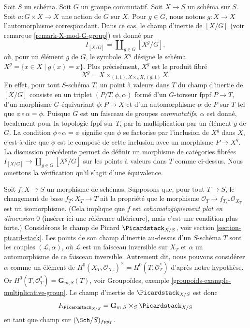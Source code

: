 \begin{example}
\label{example-inertia-stack-of-X-mod-G}
Soit $S$ un schéma. Soit $G$ un groupe commutatif.
Soit $X \to S$ un schéma sur $S$.
Soit $a : G \times X \to X$ une action de $G$ sur $X$.
Pour $g \in G$, nous notons $g : X \to X$ l'automorphisme correspondant.
Dans ce cas, le champ d'inertie de $[X/G]$ (voir
remarque \ref{remark-X-mod-G-group})
est donné par
$$
I_{[X/G]} = \coprod\nolimits_{g\in G} [X^g/G],
$$
où, pour un élément $g$ de $G$, le symbole $X^g$ désigne le
schéma $X^g = \{x \in X \mid g(x) = x\}$. Plus précisément,
$X^g$ est le produit
fibré
$$
X^g =  X \times_{(1, 1), X \times_S X, (g, 1)} X.
$$
En effet, pour tout $S$-schéma $T$, un
point à valeurs dans $T$ du champ d'inertie de $[X/G]$ consiste en un
triplet $(P/T, \phi, \alpha)$ formé d'un $G$-torseur fppf
$P \to T$, d'un morphisme $G$-équivariant
$\phi : P \to X$ et
d'un automorphisme $\alpha$ de $P$ sur $T$ tel que
$\phi \circ \alpha = \phi$.
Puisque $G$ est un faisceau de groupes \emph{commutatifs},
$\alpha$ est donné, localement pour la topologie fppf sur $T$,
par la multiplication par un élément $g$ de $G$.
La condition $\phi \circ \alpha = \phi$ signifie que $\phi$
se factorise par l'inclusion de $X^g$
dans $X$, c'est-à-dire que $\phi$ est le composé de cette inclusion avec un
morphisme $P \to X^g$.
La discussion précédente permet de définir un morphisme de catégories fibrées
$I_{[X/G]} \to \coprod_{g\in G} [X^g/G]$ sur les points à valeurs dans $T$ comme ci-dessus.
Nous omettons la vérification qu'il s'agit d'une équivalence.
\end{example}

\begin{example}
\label{example-inertia-stack-of-picard}
Soit $f : X \to S$ un morphisme de schémas.
Supposons que, pour tout $T \to S$, le changement de base $f_T : X_T \to T$
ait la propriété que le morphisme $\mathcal{O}_T \to f_{T, *}\mathcal{O}_{X_T}$
est un isomorphisme. (Cela implique que $f$ est
{\it cohomologiquement plat en dimension $0$} (insérer ici une référence ultérieure),
mais c'est une condition plus forte.) Considérons le champ de Picard $\Picardstack_{X/S}$, voir
section \ref{section-picard-stack}.
Les points de son champ d'inertie au-dessus d'un
$S$-schéma $T$ sont les couples $(\mathcal{L}, \alpha)$,
où $\mathcal{L}$ est un faisceau inversible
sur $X_T$ et $\alpha$ un automorphisme de ce faisceau inversible.
Autrement dit, nous pouvons considérer $\alpha$ comme un élément de
$H^0(X_T, \mathcal{O}_{X_T})^\times = H^0(T, \mathcal{O}_T^*)$
d'après notre hypothèse. Or $H^0(T, \mathcal{O}_T^*) = \mathbf{G}_{m, S}(T)$,
voir Groupoïdes, exemple \ref{groupoids-example-multiplicative-group}.
Le champ d'inertie de $\Picardstack_{X/S}$ est donc
$$
I_{\Picardstack_{X/S}} = \mathbf{G}_{m, S} \times_S \Picardstack_{X/S}
$$
en tant que champ sur $(\Sch/S)_{fppf}$.
\end{example}






